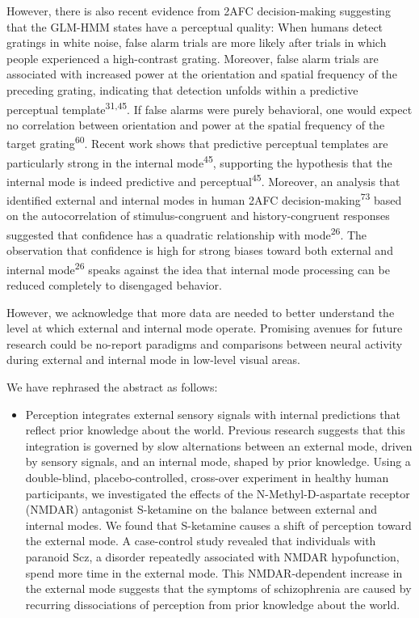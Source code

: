 \documentclass[
]{article}
\providecommand{\tightlist}{%
  \setlength{\itemsep}{0pt}\setlength{\parskip}{0pt}}
\begin{document}
However, there is also recent evidence from 2AFC decision-making
suggesting that the GLM-HMM states have a perceptual quality: When
humans detect gratings in white noise, false alarm trials are more
likely after trials in which people experienced a high-contrast grating.
Moreover, false alarm trials are associated with increased power at the
orientation and spatial frequency of the preceding grating, indicating
that detection unfolds within a predictive perceptual
template\textsuperscript{31,45}. If false alarms were purely behavioral,
one would expect no correlation between orientation and power at the
spatial frequency of the target grating\textsuperscript{60}. Recent work
shows that predictive perceptual templates are particularly strong in
the internal mode\textsuperscript{45}, supporting the hypothesis that
the internal mode is indeed predictive and
perceptual\textsuperscript{45}. Moreover, an analysis that identified
external and internal modes in human 2AFC
decision-making\textsuperscript{73} based on the autocorrelation of
stimulus-congruent and history-congruent responses suggested that
confidence has a quadratic relationship with mode\textsuperscript{26}.
The observation that confidence is high for strong biases toward both
external and internal mode\textsuperscript{26} speaks against the idea
that internal mode processing can be reduced completely to disengaged
behavior.

However, we acknowledge that more data are needed to better understand
the level at which external and internal mode operate. Promising avenues
for future research could be no-report paradigms and comparisons between
neural activity during external and internal mode in low-level visual
areas.

We have rephrased the abstract as follows:

\begin{itemize}
\tightlist
\item
  Perception integrates external sensory signals with internal
  predictions that reflect prior knowledge about the world. Previous
  research suggests that this integration is governed by slow
  alternations between an external mode, driven by sensory signals, and
  an internal mode, shaped by prior knowledge. Using a double-blind,
  placebo-controlled, cross-over experiment in healthy human
  participants, we investigated the effects of the N-Methyl-D-aspartate
  receptor (NMDAR) antagonist S-ketamine on the balance between external
  and internal modes. We found that S-ketamine causes a shift of
  perception toward the external mode. A case-control study revealed
  that individuals with paranoid Scz, a disorder repeatedly associated
  with NMDAR hypofunction, spend more time in the external mode. This
  NMDAR-dependent increase in the external mode suggests that the
  symptoms of schizophrenia are caused by recurring dissociations of
  perception from prior knowledge about the world.
\end{itemize}
\end{document}
